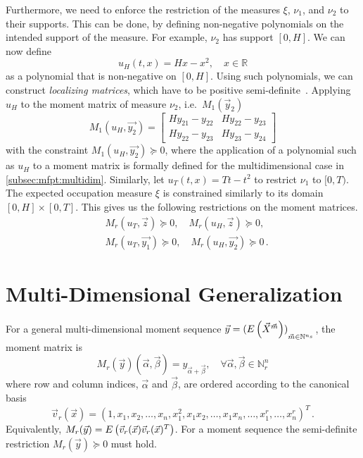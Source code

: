 Furthermore, we need to enforce the restriction of the measures $\xi$, $\nu_1$, and $\nu_2$
to their supports.
This can be done, by defining non-negative polynomials
on the intended support of the measure.
For example, $\nu_2$ has support $[0,H]$. We can now define
$$
u_H(t,x) = Hx - x^2, \quad x\in \mathbb R
$$
as a polynomial that is non-negative on $[0,H]$.
Using such polynomials, we can construct \emph{localizing matrices},
which have to be positive semi-definite~\cite{lasserre2010moments}.
Applying $u_H$ to the moment matrix of measure $\nu_2$, i.e.\ $M_1(\vec{y}_2)$
$$
M_1(u_H, \vec{y_2})=
\begin{bmatrix}
    Hy_{21} - y_{22} & Hy_{22} - y_{23} \\
    Hy_{22} - y_{23} & Hy_{23} - y_{24}
\end{bmatrix}
$$
with the constraint $M_1(u_H, \vec{y_2})\succeq 0$, where the application of
a polynomial such as $u_H$ to a moment matrix
is formally defined for the multidimensional case in \autoref{subsec:mfpt:multidim}.
Similarly, let $u_T(t, x) = Tt-t^2$ to restrict $\nu_1$ to $[0,T)$.
The expected occupation measure $\xi$ is constrained similarly to its domain
$[0,H]\times[0,T]$.
This gives us the following restrictions on the moment matrices.
\begin{equation}\label{eq:localizing_sd_constraints}
\begin{split}
&M_r(u_T,\vec{z})\succeq 0, \quad M_r(u_H,\vec{z})\succeq 0,\\
&M_r(u_T,\vec{y_1})\succeq 0,\quad M_r(u_H,\vec{y_2})\succeq 0\,.
\end{split}
\end{equation}

\section{Multi-Dimensional Generalization}
\label{subsec:mfpt:multidim}
For a general multi-dimensional moment sequence
$\vec{y}={({E}\left(\vec X^{\vec{m}}\right))}_{\vec{m}\in\mathbb{N}^{n_s}}$, the moment
matrix is~\cite{lasserre2010moments}
$$M_r(\vec y)(\vec\alpha,\vec\beta)
=y_{\vec\alpha + \vec\beta},\quad\forall\vec{\alpha},
\vec{\beta}\in\mathbb{N}_r^n$$
where row and column indices, $\vec{\alpha}$ and $\vec\beta$, are ordered according to the canonical basis
\begin{equation}\label{eq:canoncial_basis}
\vec{v}_r(\vec{x}) =
{(1,x_1,x_2,\dots,x_n,x_1^2,x_1x_2,\dots ,x_1x_n,\dots ,x_1^r,\dots
	,x_n^r)}^T\,.
\end{equation}
Equivalently, $M_r(\vec{y})={E}\left(\vec{v}_r (\vec x)\vec{v}_r(\vec x)^T\right)$.
For a moment sequence the semi-definite restriction $M_r(\vec{y})\succeq 0$ must hold.

